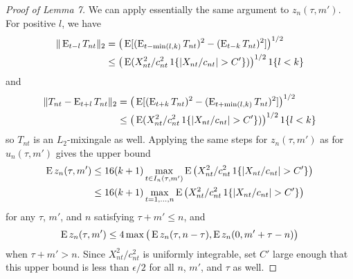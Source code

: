\documentclass[11pt]{article}
\begin{document}
{\begin{proof}[Proof of Lemma 7]
  We can apply essentially the same argument to $z_n(\tau, m')$. For
  positive $l$, we have
  \begin{align*}
    \| \operatorname{E}_{t-l} T_{nt} \|_2 &=
    \big(\operatorname{E}[(\operatorname{E}_{t-\min(l, k)} T_{nt})^2 - (\operatorname{E}_{t-k} T_{nt})^2]\big)^{1/2} \\
    &\leq \big(\operatorname{E}( X_{nt}^2/c_{nt}^2
    \operatorname{1}\{|X_{nt}/c_{nt}| > C'\}) \big)^{1/2}\operatorname{1}\{l < k\}
  \end{align*}
  and
  \begin{align*}
    \| T_{nt} - \operatorname{E}_{t+l} T_{nt} \|_2
    &= \big(\operatorname{E}[ (\operatorname{E}_{t+k} T_{nt} )^2 - (\operatorname{E}_{t+\min(l,k)} T_{nt})^2] \big)^{1/2}\\
    &\leq \big(\operatorname{E}( X_{nt}^2/c_{nt}^2
    \operatorname{1}\{|X_{nt}/c_{nt}| > C'\})\big)^{1/2} \operatorname{1}\{l < k\}
  \end{align*}
  so $T_{nt}$ is an $L_2$-mixingale as well. Applying the same steps
  for $z_{n}(\tau, m')$ as for $u_n(\tau, m')$ gives the upper bound
  \begin{align*}
    \operatorname{E} z_n(\tau, m')
    &\leq 16 (k+1) \max_{t \in I_n(\tau, m')} \operatorname{E}\big( X_{nt}^2/c_{nt}^2
    \operatorname{1}\{|X_{nt}/c_{nt}| > C'\}\big) \\
    &\leq 16 (k+1) \max_{t = 1,\dots,n} \operatorname{E}\big( X_{nt}^2/c_{nt}^2
    \operatorname{1}\{|X_{nt}/c_{nt}| > C'\}\big)
  \end{align*}
  for any $\tau$, $m'$, and $n$ satisfying $\tau + m' \leq n$, and
  \begin{equation*}
    \operatorname{E} z_n(\tau, m')
    \leq 4 \max\big(\operatorname{E} z_n(\tau, n - \tau),
                    \operatorname{E} z_n(0, m' + \tau - n) \big)
  \end{equation*}
  when $\tau + m' > n$.
  Since $X_{nt}^2/c_{nt}^2$ is uniformly integrable, set $C'$ large
  enough that this upper bound is less than $\epsilon/2$ for all $n$,
  $m'$, and $\tau$ as well.


\end{proof}}
\end{document}
